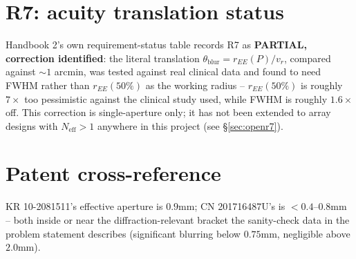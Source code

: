 \documentclass[11pt]{report}
\newcommand{\vr}{v_r}
\newcommand{\Neff}{N_{\text{eff}}}
\begin{document}
\section{R7: acuity translation status}
\label{sec:r7status}
Handbook 2's own requirement-status table records R7 as \textbf{PARTIAL, correction
identified}: the literal translation $\theta_{\text{blur}} = r_{EE}(P)/\vr$, compared against
$\sim1$ arcmin, was tested against real clinical data and found to need FWHM rather than
$r_{EE}(50\%)$ as the working radius -- $r_{EE}(50\%)$ is roughly $7\times$ too pessimistic
against the clinical study used, while FWHM is roughly $1.6\times$ off. This correction is
single-aperture only; it has not been extended to array designs with $\Neff>1$ anywhere in
this project (see \S\ref{sec:openr7}).

\section{Patent cross-reference}
KR 10-2081511's effective aperture is $0.9$mm; CN 201716487U's is $<0.4$--$0.8$mm -- both
inside or near the diffraction-relevant bracket the sanity-check data in the problem
statement describes (significant blurring below $0.75$mm, negligible above $2.0$mm).
\end{document}
